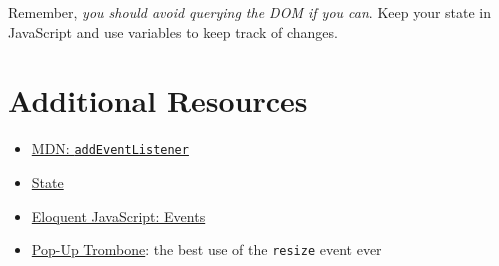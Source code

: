 Remember, \textit{you should avoid querying the DOM if you can}. Keep your state in JavaScript and use variables to keep track of changes.



\section{Additional Resources}

\begin{itemize}[leftmargin=*]
    \item \href{https://developer.mozilla.org/en-US/docs/Web/API/EventTarget/addEventListener}{MDN: \texttt{addEventListener}}
    \item \href{https://goo.gl/cn9pWm}{State}
    \item \href{https://eloquentjavascript.net/14_event.html}{Eloquent JavaScript: Events}
    \item \href{https://matthewrayfield.com/goodies/popup-trombone/}{Pop-Up Trombone}: the best use of the \texttt{resize} event ever
\end{itemize}
